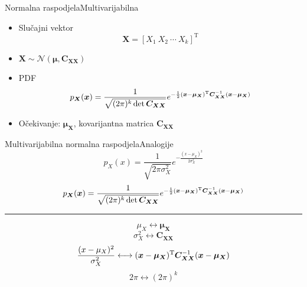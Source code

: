 \documentclass[aspectratio=169]{beamer}
\begin{document}
{

	 {
	}

  \begin{frame}{Normalna raspodjela}{Multivarijabilna}
    \begin{itemize}
      \item Slučajni vektor
        $$\bm X = [ X_1\ X_2\ \cdots\ X_k]^\mathrm T$$
      \item $\bm X \sim \mathcal{N}(\bm\mu, \bm C_{\bm X\bm X})$
      \item PDF
        $$p_{\bm X}(\bm x) 
        = \frac{1}{\sqrt{(2\pi)^k \det \bm C_{\bm X \bm X}}} e^{ -\frac{1}{2}(\bm x -
          \bm\mu_{\bm X})^\text T \bm C_{\bm X \bm X}^{-1} (\bm x - \bm\mu_{\bm
        X})}$$
      \item Očekivanje: $\bm\mu_{\bm X}$, kovarijantna matrica $\bm C_{\bm X\bm
        X}$

    \end{itemize}
  \end{frame}
}

  \begin{frame}{Multivarijabilna normalna raspodjela}{Analogije}
    $$p_X(x) = \frac{1}{\sqrt{2\pi\sigma_X^2}} e^{-\frac{(x-\mu_X)^2}{2\sigma_X^2}}$$
    $$p_{\bm X}(\bm x) 
    = \frac{1}{\sqrt{(2\pi)^k \det \bm C_{\bm X \bm X}}} e^{ -\frac{1}{2}(\bm x -
      \bm\mu_{\bm X})^\text T \bm C_{\bm X \bm X}^{-1} (\bm x - \bm\mu_{\bm
      X})}$$
    \vspace{15pt}
    \hrule
    $$\mu_X \longleftrightarrow \bm\mu_{\bm X}$$
    $$\sigma_X^2 \longleftrightarrow \bm C_{\bm X\bm X}$$
    $$ \frac{(x-\mu_X)^2}{\sigma_X^2} \longleftrightarrow
      (\bm x-\bm\mu_{\bm X})^\text T \bm C_{\bm X \bm X}^{-1}
      (\bm x - \bm\mu_{\bm X})$$
    $$2\pi \longleftrightarrow (2\pi)^k$$
  \end{frame}
\end{document}
